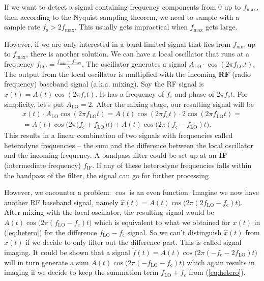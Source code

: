 \documentclass[a4paper,12pt,twoside,openright]{report}
\begin{document}
If we want to detect a signal containing frequency components from $0$ up to $f_\text{max}$, then according to the Nyquist sampling theorem, we need to sample with a sample rate $f_\text{s} > 2 f_\text{max}$. This usually gets impractical when $f_\text{max}$ gets large.

However, if we are only interested in a band-limited signal that lies from $f_\text{min}$ up to $f_\text{max}$, there is another solution. We can have a local oscillator that runs at a frequency $f_\text{LO} = \frac{f_\text{min}+f_\text{max}}{2}$. The oscillator generates a signal $A_\text{LO} \cdot \cos(2 \pi f_\text{LO} t)$. The output from the local oscillator is multiplied with the incoming \textbf{RF} (radio frequency) baseband signal (a.k.a. mixing). Say the RF signal is $x(t) = A(t) \cos(2 \pi f_\text{c} t)$. It has a frequency of $f_\text{c}$ and phase of $2 \pi f_\text{c} t$. For simplicity, let's put $A_\text{LO} = 2$. After the mixing stage, our resulting signal will be
\begin{multline}
\label{eq:hetero}
x(t) \cdot A_\text{LO} \cos(2 \pi f_\text{LO} t) =  A(t) \cos(2 \pi f_\text{c} t) \cdot 2 \cos(2 \pi f_\text{LO} t) = \\
=  A(t) \cos\big( 2 \pi (f_\text{c} + f_\text{LO} \big) t\big) + A(t) \cos\big( 2 \pi (f_\text{c} - f_\text{LO}) t \big) .
\end{multline}
This results in a linear combination of two signals with frequencies called heterodyne frequencies -- the sum and the difference between the local oscillator and the incoming frequency. A bandpass filter could be set up at an \textbf{IF} (intermediate frequency) $f_\text{IF}$. If any of these heterodyne frequencies falls within the bandpass of the filter, the signal can go for further processing.

However, we encounter a problem: $\cos$ is an even function. Imagine we now have another RF baseband signal, namely $\hat{x}(t) = A(t) \cos\big( 2 \pi (2 f_\text{LO} - f_\text{c}) t\big)$. After mixing with the local oscillator, the resulting signal would be $A(t) \cos\big( 2 \pi (f_\text{LO} - f_\text{c}) t \big)$ which is equivalent to what we obtained for $x(t)$ in (\ref{eq:hetero}) for the difference $f_\text{LO} - f_\text{c}$ signal. So we can't distinguish $\hat{x}(t)$ from $x(t)$ if we decide to only filter out the difference part. This is called signal imaging. It could be shown that a signal $\tilde{f}(t) = A(t) \cos\big( 2 \pi (- f_\text{c} - 2 f_\text{LO}) t\big)$ will in turn generate a sum $A(t) \cos\big( 2 \pi ( - f_\text{LO} - f_\text{c}) t \big)$ which again results in imaging if we decide to keep the summation term $f_\text{LO} + f_\text{c}$ from (\ref{eq:hetero}).
\end{document}
